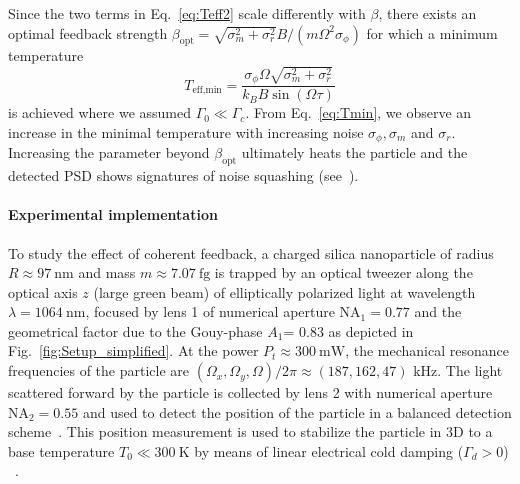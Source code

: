 \documentclass[reprint,aps,prl,superscriptaddress]{revtex4-2}
\begin{document}
Since the two terms in Eq.~\ref{eq:Teff2} scale differently with $\beta$, there exists an optimal feedback strength $\beta_\text{opt}= \sqrt{\sigma_m^2 + \sigma_r^2} B/(m\Omega^2 \sigma_\phi)$
for which a minimum temperature 
\begin{equation}\label{eq:Tmin}
    T_\text{eff,min} = \frac{\sigma_\phi\Omega\sqrt{\sigma_m^2+\sigma_r^2}}{k_B B \sin(\Omega\tau)}
\end{equation}is achieved where we assumed $\Gamma_0 \ll\Gamma_c$. 
From Eq.~\ref{eq:Tmin}, we observe an increase in the minimal temperature with increasing noise $\sigma_\phi,\sigma_m$ and $\sigma_r$. 
Increasing the parameter beyond $\beta_\text{opt}$ ultimately heats the particle and the detected PSD shows signatures of noise squashing (see~\cite{SM}). %


\paragraph{Experimental implementation}
To study the effect of coherent feedback, a charged silica nanoparticle of radius $R \approx \SI{97}{\nano\meter}$ and mass $m \approx \SI{7.07}{\femto\gram}$ is trapped by an optical tweezer along the optical axis $z$ (large green beam) of elliptically polarized light at wavelength $\lambda = \SI{1064}{\nano\meter}$, focused by lens 1 of numerical aperture $\text{NA}_1=0.77$ and the geometrical factor due to the Gouy-phase $A_1$= 0.83 as depicted in Fig.~\ref{fig:Setup_simplified}. At the power $P_t\approx\SI{300}{\milli\watt}$, the mechanical resonance frequencies of the particle are $(\Omega_x,\Omega_y,\Omega )/2\pi\approx(187, 162, 47)$ kHz. The light scattered forward by the particle is collected by lens 2 with numerical aperture $\text{NA}_2=0.55$ and used to detect the position of the particle in a balanced detection scheme~\cite{gieseler2012subkelvin}. This position measurement is used to stabilize the particle in 3D to a base temperature $T_0\ll \SI{300}{\kelvin}$ by means of linear electrical cold damping ($\Gamma_d>0$) ~\cite{conangla2019optimal,Tomassi2025-inverted-potential}. 
\end{document}
